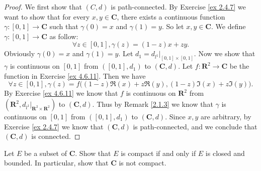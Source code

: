 \begin{proof}
    We first show that \((C, d)\) is path-connected.
    By Exercise \ref{ex 2.4.7} we want to show that for every \(x, y \in \mathbf{C}\), there exists a continuous function \(\gamma : [0, 1] \to \mathbf{C}\) such that \(\gamma(0) = x\) and \(\gamma(1) = y\).
    So let \(x, y \in \mathbf{C}\).
    We define \(\gamma : [0, 1] \to \mathbf{C}\) as follow:
    \[
        \forall z \in [0, 1], \gamma(z) = (1 - z)x + zy.
    \]
    Obviously \(\gamma(0) = x\) and \(\gamma(1) = y\).
    Let \(d_1 = d_{l^1}|_{[0, 1] \times [0, 1]}\).
    Now we show that \(\gamma\) is continuous on \([0, 1]\) from \(([0, 1], d_1)\) to \((\mathbf{C}, d)\).
    Let \(f : \mathbf{R}^2 \to \mathbf{C}\) be the function in Exercise \ref{ex 4.6.11}.
    Then we have
    \[
        \forall z \in [0, 1], \gamma(z) = f\big((1 - z) \Re(x) + z \Re(y), (1 - z) \Im(x) + z \Im(y)\big).
    \]
    By Exercise \ref{ex 4.6.11} we know that \(f\) is continuous on \(\mathbf{R}^2\) from \((\mathbf{R}^2, d_{l^1}|_{\mathbf{R}^2 \times \mathbf{R}^2})\) to \((\mathbf{C}, d)\).
    Thus by Remark \ref{2.1.3} we know that \(\gamma\) is continuous on \([0, 1]\) from \(([0, 1], d_1)\) to \((\mathbf{C}, d)\).
    Since \(x, y\) are arbitrary, by Exercise \ref{ex 2.4.7} we know that \((\mathbf{C}, d)\) is path-connected, and we conclude that \((\mathbf{C}, d)\) is connected.
\end{proof}

\begin{exercise}\label{ex 4.6.13}
    Let \(E\) be a subset of \(\mathbf{C}\).
    Show that \(E\) is compact if and only if \(E\) is closed and bounded.
    In particular, show that \(\mathbf{C}\) is not compact.
\end{exercise}

